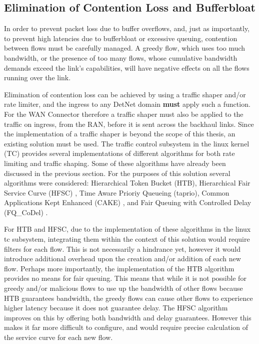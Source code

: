 \subsection{Elimination of Contention Loss and Bufferbloat}

In order to prevent packet loss due to buffer overflows, and, just as importantly, to prevent high latencies due to bufferbloat \cite{bufferbloat}or excessive queuing, contention between flows must be carefully managed. A greedy flow, which uses too much bandwidth, or the presence of too many flows, whose cumulative bandwidth demands exceed the link's capabilities, will have negative effects on all the flows running over the link.

Elimination of contention loss can be achieved by using a traffic shaper and/or rate limiter, and the ingress to any DetNet domain \textbf{must} apply such a function. For the WAN Connector therefore a traffic shaper must also be applied to the traffic on ingress, from the RAN, before it is sent across the backhaul links. Since the implementation of a traffic shaper is beyond the scope of this thesis, an existing solution must be used. The traffic control subsystem in the linux kernel (TC) provides several implementations of different algorithms for both rate limiting and traffic shaping. Some of these algorithms have already been discussed in the previous section. For the purposes of this solution several algorithms were considered: Hierarchical Token Bucket (HTB), Hierarchical Fair Service Curve (HFSC) \cite{hfsc}, Time Aware Prioriy Queueing (taprio), Common Applications Kept Enhanced (CAKE) \cite{cake}, and Fair Queuing with Controlled Delay (FQ\_CoDel) \cite{fq-codel}.

For HTB and HFSC, due to the implementation of these algorithms in the linux tc subsystem, integrating them within the context of this solution would require filters for each flow. This is not necessarily a hindrance yet, however it would introduce additional overhead upon the creation and/or addition of each new flow. Perhaps more importantly, the implementation of the HTB algorithm provides no means for fair queuing. This means that while it is not possible for greedy and/or malicious flows to use up the bandwidth of other flows because HTB guarantees bandwidth, the greedy flows can cause other flows to experience higher latency because it does not guarantee delay. The HFSC algorithm improves on this by offering both bandwidth and delay guarantees. However this makes it far more difficult to configure, and would require precise calculation of the service curve for each new flow.

